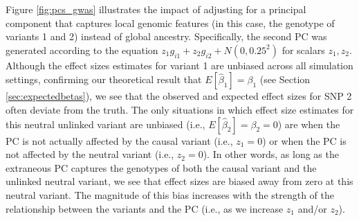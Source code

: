 \documentclass[12pt]{article}
\begin{document}
Figure \ref{fig:pcs_gwas} illustrates the impact of adjusting for a principal component that captures local genomic features (in this case, the genotype of variants 1 and 2) instead of global ancestry. 
Specifically, the second PC was generated according to the equation $z_1 g_{i1} + z_2 g_{i2} + N(0, 0.25^2)$ for scalars $z_1, z_2$.
Although the effect sizes estimates for variant 1 are unbiased across all simulation settings, confirming our theoretical result that $E[\hat\beta_1] = \beta_1$ (see Section \ref{sec:expectedbetas}), we see that the observed and expected effect sizes for SNP 2 often deviate from the truth. 
The only situations in which effect size estimates for this neutral unlinked variant are unbiased (i.e., $E[\hat\beta_2] = \beta_2 = 0$) are when the PC is not actually affected by the causal variant (i.e., $z_1 = 0$) or when the PC is not affected by the neutral variant (i.e., $z_2 = 0$). 
In other words, as long as the extraneous PC captures the genotypes of both the causal variant and the unlinked neutral variant, we see that effect sizes are biased away from zero at this neutral variant.
The magnitude of this bias increases with the strength of the relationship between the variants and the PC (i.e., as we increase $z_1$ and/or $z_2$).
\end{document}
